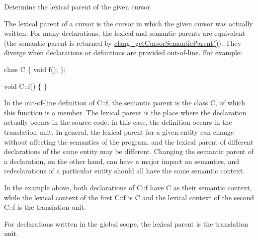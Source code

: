 Determine the lexical parent of the given cursor. 

The lexical parent of a cursor is the cursor in which the given {\ttfamily cursor} was actually written. For many declarations, the lexical and semantic parents are equivalent (the semantic parent is returned by {\ttfamily \mbox{\hyperlink{group__CINDEX__CURSOR__MANIP_gabc327b200d46781cf30cb84d4af3c877}{clang\+\_\+get\+Cursor\+Semantic\+Parent()}}}). They diverge when declarations or definitions are provided out-\/of-\/line. For example\+:


\begin{DoxyCode}
\textcolor{keyword}{class }C \{
 \textcolor{keywordtype}{void} f();
\};

\textcolor{keywordtype}{void} C::f() \{ \}
\end{DoxyCode}


In the out-\/of-\/line definition of {\ttfamily C\+::f}, the semantic parent is the class {\ttfamily C}, of which this function is a member. The lexical parent is the place where the declaration actually occurs in the source code; in this case, the definition occurs in the translation unit. In general, the lexical parent for a given entity can change without affecting the semantics of the program, and the lexical parent of different declarations of the same entity may be different. Changing the semantic parent of a declaration, on the other hand, can have a major impact on semantics, and redeclarations of a particular entity should all have the same semantic context.

In the example above, both declarations of {\ttfamily C\+::f} have {\ttfamily C} as their semantic context, while the lexical context of the first {\ttfamily C\+::f} is {\ttfamily C} and the lexical context of the second {\ttfamily C\+::f} is the translation unit.

For declarations written in the global scope, the lexical parent is the translation unit. \mbox{\label{group__CINDEX__CURSOR__MANIP_gaab07659398c4538771d62c81ca5dea69}} 
